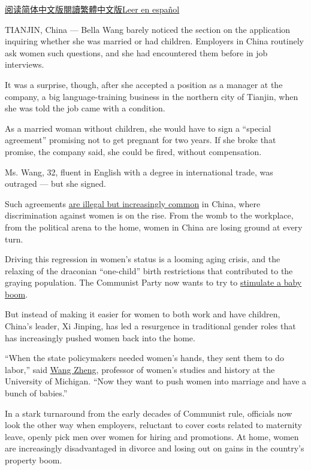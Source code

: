 \href{https://cn.nytimes.com/china/20190717/china-women-discrimination/}{阅读简体中文版}\href{https://cn.nytimes.com/china/20190717/china-women-discrimination/zh-hant/}{閱讀繁體中文版}\href{https://www.nytimes.com/es/2019/07/21/china-discriminacion-genero-mujeres}{Leer
en español}

TIANJIN, China --- Bella Wang barely noticed the section on the
application inquiring whether she was married or had children. Employers
in China routinely ask women such questions, and she had encountered
them before in job interviews.

It was a surprise, though, after she accepted a position as a manager at
the company, a big language-training business in the northern city of
Tianjin, when she was told the job came with a condition.

As a married woman without children, she would have to sign a ``special
agreement'' promising not to get pregnant for two years. If she broke
that promise, the company said, she could be fired, without
compensation.

Ms. Wang, 32, fluent in English with a degree in international trade,
was outraged --- but she signed.

Such agreements
\href{https://www.nytimes.com/2019/02/21/world/china-gender-discrimination-workplace.html?searchResultPosition=5}{are
illegal but increasingly common} in China, where discrimination against
women is on the rise. From the womb to the workplace, from the political
arena to the home, women in China are losing ground at every turn.

Driving this regression in women's status is a looming aging crisis, and
the relaxing of the draconian ``one-child'' birth restrictions that
contributed to the graying population. The Communist Party now wants to
try to
\href{https://www.nytimes.com/2018/08/11/world/asia/china-one-child-policy-birthrate.html}{stimulate
a baby boom}.

But instead of making it easier for women to both work and have
children, China's leader, Xi Jinping, has led a resurgence in
traditional gender roles that has increasingly pushed women back into
the home.

``When the state policymakers needed women's hands, they sent them to do
labor,'' said \href{https://irwg.umich.edu/people/wang-zheng}{Wang
Zheng}, professor of women's studies and history at the University of
Michigan. ``Now they want to push women into marriage and have a bunch
of babies.''

In a stark turnaround from the early decades of Communist rule,
officials now look the other way when employers, reluctant to cover
costs related to maternity leave, openly pick men over women for hiring
and promotions. At home, women are increasingly disadvantaged in divorce
and losing out on gains in the country's property boom.

